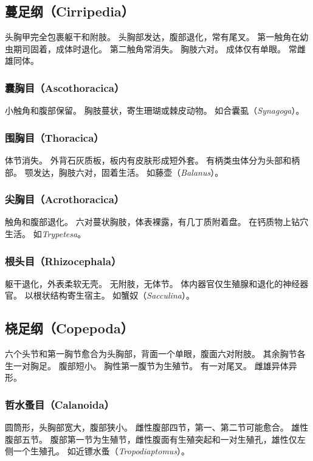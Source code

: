 \documentclass[11pt]{article}
\begin{document}
\subsection{蔓足纲（Cirripedia）}
头胸甲完全包裹躯干和附肢。
头胸部发达，腹部退化，常有尾叉。
第一触角在幼虫期司固着，成体时退化。
第二触角常消失。
胸肢六对。
成体仅有单眼。
常雌雄同体。

\subsubsection{囊胸目（Ascothoracica）}
小触角和腹部保留。
胸肢蔓状，寄生珊瑚或棘皮动物。
如合囊虱（\textit{Synagoga}）。

\subsubsection{围胸目（Thoracica）}
体节消失。
外背石灰质板，板内有皮肤形成短外套。
有柄类虫体分为头部和柄部。
颚发达，胸肢六对，固着生活。
如藤壶（\textit{Balanus}）。

\subsubsection{尖胸目（Acrothoracica）}
触角和腹部退化。
六对蔓状胸肢，体表裸露，有几丁质附着盘。
在钙质物上钻穴生活。
如\textit{Trypetesa}。

\subsubsection{根头目（Rhizocephala）}
躯干退化，外表柔软无壳。
无附肢，无体节。
体内器官仅生殖腺和退化的神经器官。
以根状结构寄生宿主。
如蟹奴（\textit{Sacculina}）。

\subsection{桡足纲（Copepoda）}
六个头节和第一胸节愈合为头胸部，背面一个单眼，腹面六对附肢。
其余胸节各生一对胸足。
腹部短小。
胸性第一腹节为生殖节。
有一对尾叉。
雌雄异体异形。

\subsubsection{哲水蚤目（Calanoida）}
圆筒形，头胸部宽大，腹部狭小。
雌性腹部四节，第一、第二节可能愈合。
雄性腹部五节。
腹部第一节为生殖节，雌性腹面有生殖突起和一对生殖孔，雄性仅左侧一个生殖孔。
如近镖水蚤（\textit{Tropodiaptomus}）。
\end{document}
